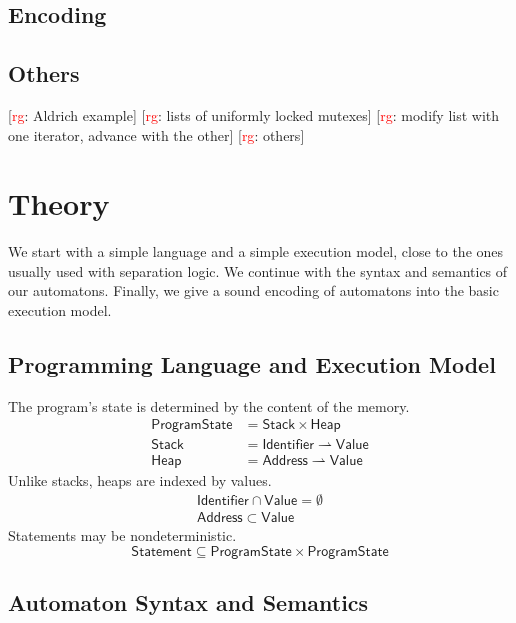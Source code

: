 \documentclass[a4paper]{article}
\newcommand{\todo}[2]{{\small [\textcolor{red}{#1}: #2]}}
\newcommand{\rg}[1]{\todo{rg}{#1}}
\newcommand{\pmap}{\rightharpoonup}
\theoremstyle{remark}
\begin{document}
\subsection{Encoding} %



\subsection{Others} %

\rg{Aldrich example}
\rg{lists of uniformly locked mutexes}
\rg{modify list with one iterator, advance with the other}
\rg{others}

\section{Theory} %

We start with a simple language and a simple execution model, close to the ones usually used with separation logic.
We continue with the syntax and semantics of our automatons.
Finally, we give a sound encoding of automatons into the basic execution model.

\subsection{Programming Language and Execution Model} %

The program's state is determined by the content of the memory.
\begin{align}
\mathsf{ProgramState}&=\mathsf{Stack}\times\mathsf{Heap} \\
\mathsf{Stack}&=\mathsf{Identifier}\pmap\mathsf{Value} \\
\mathsf{Heap}&=\mathsf{Address}\pmap\mathsf{Value}
\end{align}
Unlike stacks, heaps are indexed by values.
\begin{gather}
\mathsf{Identifier}\cap\mathsf{Value}=\emptyset \\
\mathsf{Address}\subset\mathsf{Value}
\end{gather}
Statements may be nondeterministic.
\begin{equation}
\mathsf{Statement}\subseteq\mathsf{ProgramState}\times\mathsf{ProgramState}
\end{equation}


\subsection{Automaton Syntax and Semantics} %
\end{document}
